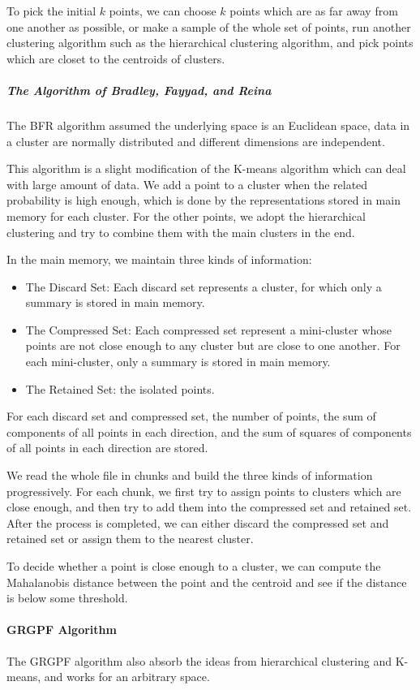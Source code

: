 \documentclass{article}
\begin{document}
To pick the initial $k$ points, we can choose $k$ points which are as far away from one another as possible, or make a sample of the whole set of points, run another clustering algorithm such as the hierarchical clustering algorithm, and pick points which are closet to the centroids of clusters.

\subparagraph{The Algorithm of Bradley, Fayyad, and Reina}
The BFR algorithm assumed the underlying space is an Euclidean space, data in a cluster are normally distributed and different dimensions are independent.

This algorithm is a slight modification of the K-means algorithm which can deal with large amount of data. We add a point to a cluster when the related probability is high enough, which is done by the representations stored in main memory for each cluster. For the other points, we adopt the hierarchical clustering and try to combine them with the main clusters in the end.

In the main memory, we maintain three kinds of information:
\begin{itemize}
\item The Discard Set: Each discard set represents a cluster, for which only a summary is stored in main memory.
\item The Compressed Set: Each compressed set represent a mini-cluster whose points are not close enough to any cluster but are close to one another. For each mini-cluster, only a summary is stored in main memory.
\item The Retained Set: the isolated points.
\end{itemize}
For each discard set and compressed set, the number of points, the sum of components of all points in each direction, and the sum of squares of components of all points in each direction are stored.

We read the whole file in chunks and build the three kinds of information progressively. For each chunk, we first try to assign points to clusters which are close enough, and then try to add them into the compressed set and retained set. After the process is completed, we can either discard the compressed set and retained set or assign them to the nearest cluster.

To decide whether a point is close enough to a cluster, we can compute the Mahalanobis distance between the point and the centroid and see if the distance is below some threshold.

\paragraph{GRGPF Algorithm}
The GRGPF algorithm also absorb the ideas from hierarchical clustering and K-means, and works for an arbitrary space.
\end{document}
